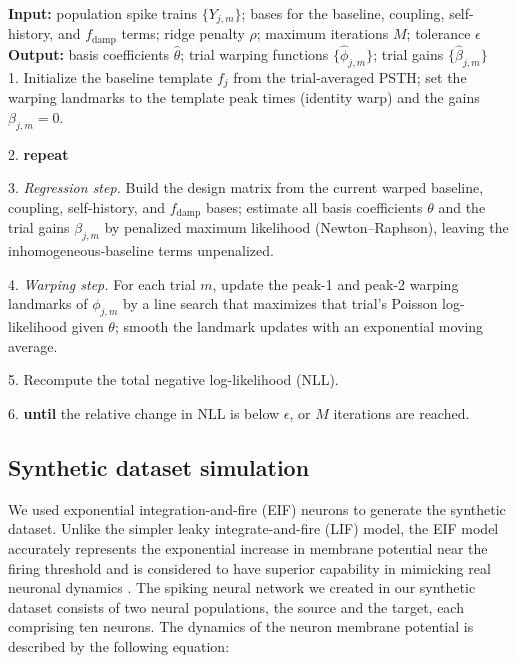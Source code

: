 \documentclass[12pt]{article}
\begin{document}
\begin{algorithm}
\caption{Fitting pop-GLM}
\label{alg: fitting}
\textbf{Input:} population spike trains $\{Y_{j,m}\}$; bases for the baseline, coupling, self-history, and $f_{\text{damp}}$ terms; ridge penalty $\rho$; maximum iterations $M$; tolerance $\epsilon$ \\
\textbf{Output:} basis coefficients $\hat{\theta}$; trial warping functions $\{\hat{\phi}_{j,m}\}$; trial gains $\{\hat{\beta}_{j,m}\}$ \\
1. Initialize the baseline template $f_j$ from the trial-averaged PSTH; set the warping landmarks to the template peak times (identity warp) and the gains $\beta_{j,m}=0$.

2. \textbf{repeat}

3. \quad \emph{Regression step.} Build the design matrix from the current warped baseline, coupling, self-history, and $f_{\text{damp}}$ bases; estimate all basis coefficients $\theta$ and the trial gains $\beta_{j,m}$ by penalized maximum likelihood (Newton--Raphson), leaving the inhomogeneous-baseline terms unpenalized.

4. \quad \emph{Warping step.} For each trial $m$, update the peak-1 and peak-2 warping landmarks of $\phi_{j,m}$ by a line search that maximizes that trial's Poisson log-likelihood given $\theta$; smooth the landmark updates with an exponential moving average.

5. \quad Recompute the total negative log-likelihood (NLL).

6. \textbf{until} the relative change in NLL is below $\epsilon$, or $M$ iterations are reached.

\end{algorithm}


\subsection{Synthetic dataset simulation}

We used exponential integration-and-fire (EIF) neurons \cite{fourcaud2003spike, gerstner2014neuronal, huang2019circuit} to generate the synthetic dataset. Unlike the simpler leaky integrate-and-fire (LIF) model, the EIF model accurately represents the exponential increase in membrane potential near the firing threshold and is considered to have superior capability in mimicking real neuronal dynamics \cite{fourcaud2003spike}. The spiking neural network we created in our synthetic dataset consists of two neural populations, the source and the target, each comprising ten neurons. The dynamics of the neuron membrane potential is described by the following equation:
\end{document}
